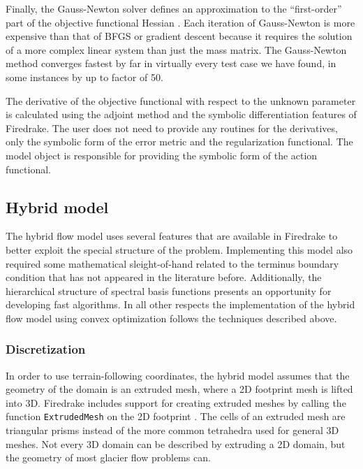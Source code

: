\documentclass[journal abbreviation, manuscript]{copernicus}
\begin{document}
Finally, the Gauss-Newton solver defines an approximation to the ``first-order'' part of the objective functional Hessian \citep{pratt1998gauss, habermann2012reconstruction}.
Each iteration of Gauss-Newton is more expensive than that of BFGS or gradient descent because it requires the solution of a more complex linear system than just the mass matrix.
The Gauss-Newton method converges fastest by far in virtually every test case we have found, in some instances by up to factor of 50.

The derivative of the objective functional with respect to the unknown parameter is calculated using the adjoint method and the symbolic differentiation features of Firedrake.
The user does not need to provide any routines for the derivatives, only the symbolic form of the error metric and the regularization functional.
The model object is responsible for providing the symbolic form of the action functional.


\subsection{Hybrid model}

The hybrid flow model uses several features that are available in Firedrake to better exploit the special structure of the problem.
Implementing this model also required some mathematical sleight-of-hand related to the terminus boundary condition that has not appeared in the literature before.
Additionally, the hierarchical structure of spectral basis functions presents an opportunity for developing fast algorithms.
In all other respects the implementation of the hybrid flow model using convex optimization follows the techniques described above.

\subsubsection{Discretization}

In order to use terrain-following coordinates, the hybrid model assumes that the geometry of the domain is an extruded mesh, where a 2D footprint mesh is lifted into 3D.
Firedrake includes support for creating extruded meshes by calling the function \texttt{ExtrudedMesh} on the 2D footprint \citep{bercea2016structure, mcrae2016automated}.
The cells of an extruded mesh are triangular prisms instead of the more common tetrahedra used for general 3D meshes.
Not every 3D domain can be described by extruding a 2D domain, but the geometry of most glacier flow problems can.
\end{document}
